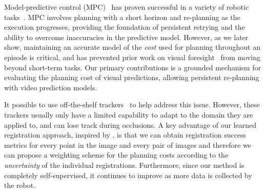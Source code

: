 Model-predictive control (MPC)~\cite{camacho2013model} has proven successful in a variety of robotic tasks~\cite{shim2003decentralized,allibert2010predictive,howard2010receding,williams2017information,deep_mpc}.
MPC involves planning with a short horizon and re-planning as the execution progresses, providing the foundation of persistent retrying and the ability to overcome inaccuracies in the predictive model. However, as we later show, maintaining an accurate model of the \emph{cost} used for planning throughout an episode is critical, and has prevented prior work on visual foresight~\cite{foresight,sna} from moving beyond short-term tasks.
Our primary contributions is a grounded mechanism for evaluating the planning cost of visual predictions, allowing persistent re-planning with video prediction models.


It possible to use off-the-shelf trackers~\cite{lucas1981iterative,brox2004high,babenko2009visual,mei2009robust} to help address this issue. However, these trackers usually only have a limited capability to adapt to the domain they are applied to, and can lose track during occlusions. A key advantage of our learned registration approach, inspired by \cite{meister2017unflow}, is that we can obtain registration success metrics for every point in the image and every pair of images and therefore we can propose a weighting scheme for the planning costs according to the \emph{uncertainty} of the individual registrations. Furthermore, since our method is completely self-supervised, it continues to improve as more data is collected by the robot.